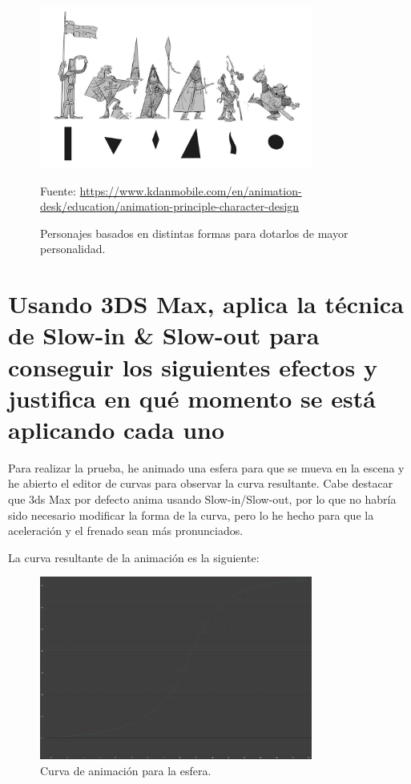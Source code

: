 \documentclass{article}
\begin{document}
\begin{figure}[H]
    \centering
    \includegraphics[width=0.8\textwidth]{imagenes/appeal.jpg}
    \caption{Personajes basados en distintas formas para dotarlos de mayor personalidad.}
    \vspace{10pt}
    \footnotesize{Fuente: \url{https://www.kdanmobile.com/en/animation-desk/education/animation-principle-character-design}}
\end{figure}

\section{Usando 3DS Max, aplica la técnica de Slow-in \& Slow-out para conseguir los siguientes efectos y justifica en qué momento se está aplicando cada uno}

Para realizar la prueba, he animado una esfera para que se mueva en la escena y he abierto el editor de curvas para observar la curva resultante. Cabe destacar que 3ds Max por defecto anima usando Slow-in/Slow-out, por lo que no habría sido necesario modificar la forma de la curva, pero lo he hecho para que la aceleración y el frenado sean más pronunciados.

\bigskip

La curva resultante de la animación es la siguiente:

\begin{figure}[H]
    \centering
    \includegraphics[width=0.8\textwidth]{imagenes/curva.png}
    \caption{Curva de animación para la esfera.}
\end{figure}
\end{document}
